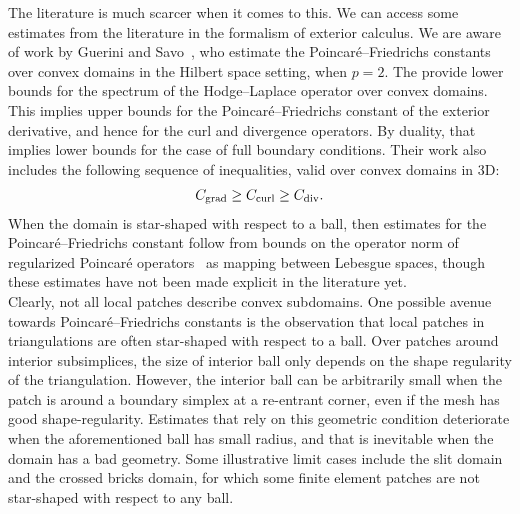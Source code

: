 \documentclass[a4paper]{article}
\begin{document}
The literature is much scarcer when it comes to this. 
We can access some estimates from the literature in the formalism of exterior calculus. 
We are aware of work by Guerini and Savo~\cite{guerini2004eigenvalue}, who estimate the Poincar\'e--Friedrichs constants over convex domains in the Hilbert space setting, when $p=2$. The provide lower bounds for the spectrum of the Hodge--Laplace operator over convex domains. This implies upper bounds for the Poincar\'e--Friedrichs constant of the exterior derivative, and hence for the curl and divergence operators.
By duality, that implies lower bounds for the case of full boundary conditions.
Their work also includes the following sequence of inequalities,
valid over convex domains in 3D:
\begin{align*}
    C_{\operatorname{grad}} \geq C_{\operatorname{curl}} \geq C_{\operatorname{div}}.
\end{align*}
When the domain is star-shaped with respect to a ball, then estimates for the Poincar\'e--Friedrichs constant 
follow from bounds on the operator norm of regularized Poincar\'e operators~\cite{costabel2010bogovskiui}
as mapping between Lebesgue spaces,
though these estimates have not been made explicit in the literature yet.
\\



Clearly, not all local patches describe convex subdomains. 
One possible avenue towards Poincar\'e--Friedrichs constants is the observation that local patches in triangulations are often star-shaped with respect to a ball. 
Over patches around interior subsimplices, the size of interior ball only depends on the shape regularity of the triangulation. 
However, the interior ball can be arbitrarily small when the patch is around a boundary simplex at a re-entrant corner, even if the mesh has good shape-regularity. 
Estimates that rely on this geometric condition deteriorate when the aforementioned ball has small radius,
and that is inevitable when the domain has a bad geometry. 
Some illustrative limit cases include the slit domain and the crossed bricks domain,
for which some finite element patches are not star-shaped with respect to any ball. 
\end{document}
